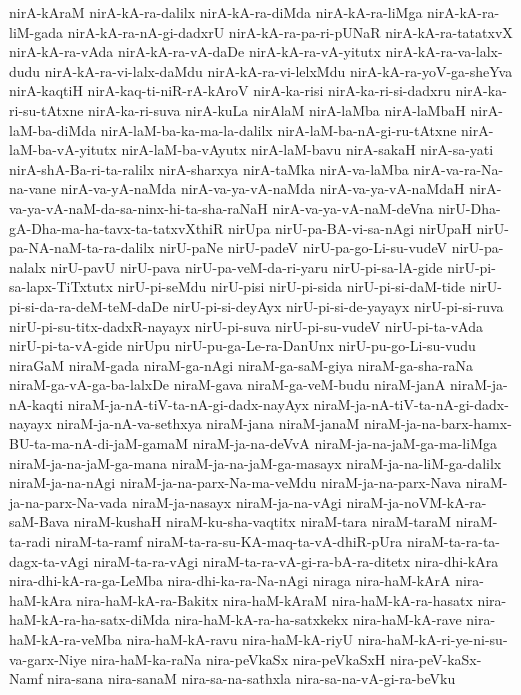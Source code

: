 {nirA-kAraM
nirA-kA-ra-dalilx
nirA-kA-ra-diMda
nirA-kA-ra-liMga
nirA-kA-ra-liM-gada
nirA-kA-ra-nA-gi-dadxrU
nirA-kA-ra-pa-ri-pUNaR
nirA-kA-ra-tatatxvX
nirA-kA-ra-vAda
nirA-kA-ra-vA-daDe
nirA-kA-ra-vA-yitutx
nirA-kA-ra-va-lalx-dudu
nirA-kA-ra-vi-lalx-daMdu
nirA-kA-ra-vi-lelxMdu
nirA-kA-ra-yoV-ga-sheYva
nirA-kaqtiH
nirA-kaq-ti-niR-rA-kAroV
nirA-ka-risi
nirA-ka-ri-si-dadxru
nirA-ka-ri-su-tAtxne
nirA-ka-ri-suva
nirA-kuLa
nirAlaM
nirA-laMba
nirA-laMbaH
nirA-laM-ba-diMda
nirA-laM-ba-ka-ma-la-dalilx
nirA-laM-ba-nA-gi-ru-tAtxne
nirA-laM-ba-vA-yitutx
nirA-laM-ba-vAyutx
nirA-laM-bavu
nirA-sakaH
nirA-sa-yati
nirA-shA-Ba-ri-ta-ralilx
nirA-sharxya
nirA-taMka
nirA-va-laMba
nirA-va-ra-Na-na-vane
nirA-va-yA-naMda
nirA-va-ya-vA-naMda
nirA-va-ya-vA-naMdaH
nirA-va-ya-vA-naM-da-sa-ninx-hi-ta-sha-raNaH
nirA-va-ya-vA-naM-deVna
nirU-Dha-gA-Dha-ma-ha-tavx-ta-tatxvXthiR
nirUpa
nirU-pa-BA-vi-sa-nAgi
nirUpaH
nirU-pa-NA-naM-ta-ra-dalilx
nirU-paNe
nirU-padeV
nirU-pa-go-Li-su-vudeV
nirU-pa-nalalx
nirU-pavU
nirU-pava
nirU-pa-veM-da-ri-yaru
nirU-pi-sa-lA-gide
nirU-pi-sa-lapx-TiTxtutx
nirU-pi-seMdu
nirU-pisi
nirU-pi-sida
nirU-pi-si-daM-tide
nirU-pi-si-da-ra-deM-teM-daDe
nirU-pi-si-deyAyx
nirU-pi-si-de-yayayx
nirU-pi-si-ruva
nirU-pi-su-titx-dadxR-nayayx
nirU-pi-suva
nirU-pi-su-vudeV
nirU-pi-ta-vAda
nirU-pi-ta-vA-gide
nirUpu
nirU-pu-ga-Le-ra-DanUnx
nirU-pu-go-Li-su-vudu
niraGaM
niraM-gada
niraM-ga-nAgi
niraM-ga-saM-giya
niraM-ga-sha-raNa
niraM-ga-vA-ga-ba-lalxDe
niraM-gava
niraM-ga-veM-budu
niraM-janA
niraM-ja-nA-kaqti
niraM-ja-nA-tiV-ta-nA-gi-dadx-nayAyx
niraM-ja-nA-tiV-ta-nA-gi-dadx-nayayx
niraM-ja-nA-va-sethxya
niraM-jana
niraM-janaM
niraM-ja-na-barx-hamx-BU-ta-ma-nA-di-jaM-gamaM
niraM-ja-na-deVvA
niraM-ja-na-jaM-ga-ma-liMga
niraM-ja-na-jaM-ga-mana
niraM-ja-na-jaM-ga-masayx
niraM-ja-na-liM-ga-dalilx
niraM-ja-na-nAgi
niraM-ja-na-parx-Na-ma-veMdu
niraM-ja-na-parx-Nava
niraM-ja-na-parx-Na-vada
niraM-ja-nasayx
niraM-ja-na-vAgi
niraM-ja-noVM-kA-ra-saM-Bava
niraM-kushaH
niraM-ku-sha-vaqtitx
niraM-tara
niraM-taraM
niraM-ta-radi
niraM-ta-ramf
niraM-ta-ra-su-KA-maq-ta-vA-dhiR-pUra
niraM-ta-ra-ta-dagx-ta-vAgi
niraM-ta-ra-vAgi
niraM-ta-ra-vA-gi-ra-bA-ra-ditetx
nira-dhi-kAra
nira-dhi-kA-ra-ga-LeMba
nira-dhi-ka-ra-Na-nAgi
niraga
nira-haM-kArA
nira-haM-kAra
nira-haM-kA-ra-Bakitx
nira-haM-kAraM
nira-haM-kA-ra-hasatx
nira-haM-kA-ra-ha-satx-diMda
nira-haM-kA-ra-ha-satxkekx
nira-haM-kA-rave
nira-haM-kA-ra-veMba
nira-haM-kA-ravu
nira-haM-kA-riyU
nira-haM-kA-ri-ye-ni-su-va-garx-Niye
nira-haM-ka-raNa
nira-peVkaSx
nira-peVkaSxH
nira-peV-kaSx-Namf
nira-sana
nira-sanaM
nira-sa-na-sathxla
nira-sa-na-vA-gi-ra-beVku
}
